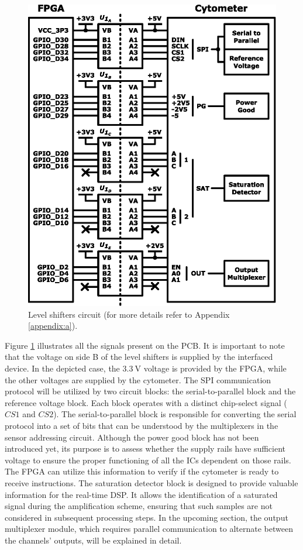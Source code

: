 \begin{figure}[!ht]
    \centering
    \includegraphics[width=.65\textwidth]{images/chapter_4/communications/comms.eps}
    \caption{Level shifters circuit (for more details refer to Appendix \ref{appendix:a}).}
    \label{figure:level-shifters}
\end{figure}

Figure \ref{figure:level-shifters} illustrates all the signals present on the \ac{PCB}. It is important to note that the voltage on side B of the level shifters is supplied by the interfaced device. In the depicted case, the $\mathrm{3.3~V}$ voltage is provided by the \ac{FPGA}, while the other voltages are supplied by the cytometer. The \ac{SPI} communication protocol will be utilized by two circuit blocks: the serial-to-parallel block and the reference voltage block. Each block operates with a distinct chip-select signal ($CS1$ and $CS2$). The serial-to-parallel block is responsible for converting the serial protocol into a set of bits that can be understood by the multiplexers in the sensor addressing circuit. Although the power good block has not been introduced yet, its purpose is to assess whether the supply rails have sufficient voltage to ensure the proper functioning of all the \ac{IC}s dependent on those rails. The \ac{FPGA} can utilize this information to verify if the cytometer is ready to receive instructions. The saturation detector block is designed to provide valuable information for the real-time \ac{DSP}. It allows the identification of a saturated signal during the amplification scheme, ensuring that such samples are not considered in subsequent processing steps. In the upcoming section, the output multiplexer module, which requires parallel communication to alternate between the channels' outputs, will be explained in detail.

